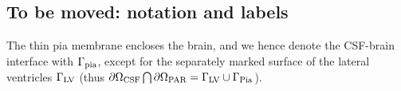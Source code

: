 \documentclass[fleqn,10pt]{wlscirep}
\newcommand{\mer}[1]{\textcolor{magenta}{#1}}
\begin{document}

\subsection*{To be moved: notation and labels}
The thin pia membrane encloses the brain, and we hence denote the CSF-brain interface with $\Gamma_{\rm pia}$, except for the separately marked surface of the lateral ventricles $\Gamma_{\rm LV}$ (thus $\partial \Omega_{\rm CSF} \bigcap \partial \Omega_{\rm PAR} = \Gamma_{\rm LV} \cup \Gamma_{\rm Pia}$).
\end{document}
